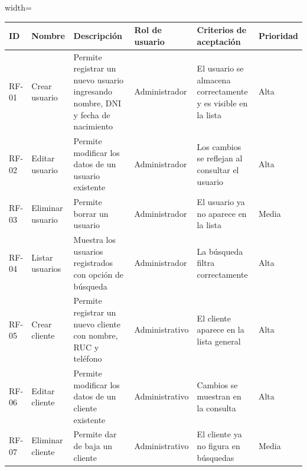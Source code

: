 \documentclass[12pt]{article} %
\begin{document}
  \begin{adjustbox}{width=\linewidth}
    \begin{tabularx}{\linewidth}{|>{\centering\arraybackslash}p{1cm}|
      >{\centering\arraybackslash}p{1.3cm}|
      >{\centering\arraybackslash}p{4.3cm}|
      >{\centering\arraybackslash}p{2.2cm}|
      >{\centering\arraybackslash}p{3.5cm}|
      >{\centering\arraybackslash}p{1.55cm}|}
\hline
      \rowcolor{headerbg} %
      \textbf{ID} & \textbf{Nombre} & \textbf{Descripción} & \textbf{Rol de usuario} & \textbf{Criterios de aceptación} & \textbf{Prioridad}\\
      \hline
      RF-01 & Crear usuario & Permite registrar un nuevo usuario ingresando nombre, DNI y fecha de nacimiento & Administrador & El usuario se almacena correctamente y es visible en la lista & Alta\\
      \hline
      RF-02 & Editar usuario & Permite modificar los datos de un usuario existente & Administrador & Los cambios se reflejan al consultar el usuario & Alta\\
      \hline
      RF-03 & Eliminar usuario & Permite borrar un usuario & Administrador & El usuario ya no aparece en la lista & Media\\
      \hline
      RF-04 & Listar usuarios & Muestra los usuarios registrados con opción de búsqueda & Administrador & La búsqueda filtra correctamente & Alta\\
      \hline
      RF-05 & Crear cliente & Permite registrar un nuevo cliente con nombre, RUC y teléfono & Administrativo & El cliente aparece en la lista general & Alta \\
      \hline
      RF-06 & Editar cliente & Permite modificar los datos de un cliente existente & Administrativo & Cambios se muestran en la consulta & Alta \\
      \hline
      RF-07 & Eliminar cliente & Permite dar de baja un cliente & Administrativo & El cliente ya no figura en búsquedas & Media \\
      \hline
    \end{tabularx}
  \end{adjustbox}
  \normalsize


  \thispagestyle{plain}
  \footnotesize %
  \renewcommand{\arraystretch}{3} %
  
\end{document}
